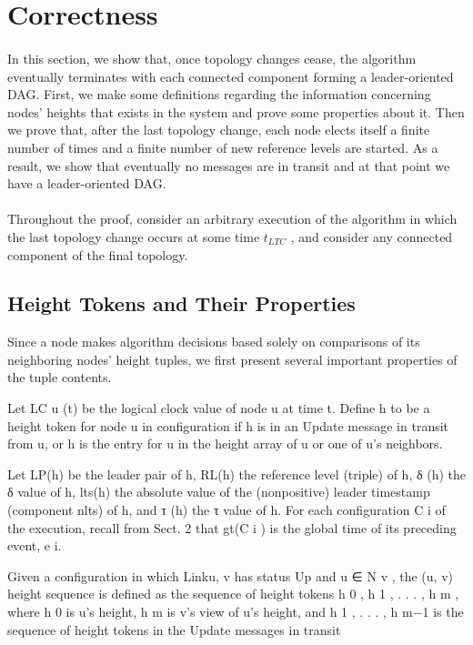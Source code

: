 \documentclass{article}
\begin{document}
\clearpage


\section{Correctness}

\paragraph{}
 
In this section, we show that, once topology changes cease, the algorithm eventually terminates with each connected component forming a leader-oriented DAG. First, we make some definitions regarding the information concerning nodes’ heights that exists in the system and prove some properties about it. Then we prove that, after the last topology change, each node elects itself a finite number of times and a finite number of new reference levels are started. As a result, we show that eventually no messages are in transit and at that point we have a leader-oriented DAG.
\paragraph{}
Throughout the proof, consider an arbitrary execution of the algorithm in which the last topology change occurs at some time $t_{LTC}$ , and consider any connected component of the final topology.

\subsection{Height Tokens and Their Properties}
Since a node makes algorithm decisions based solely on comparisons of its neighboring nodes’ height tuples, we
first present several important properties of the tuple contents.

Let LC u (t) be the logical clock value of node u at time t. Define h to be a height token for node u in configuration if h is in an Update message in transit from u, or h is the entry for u in the height array of u or one of u’s neighbors.

Let LP(h) be the leader pair of h, RL(h) the reference level (triple) of h, δ (h) the δ value of h, lts(h) the absolute value of the (nonpositive) leader timestamp (component nlts) of h, and τ (h) the τ value of h. For each configuration C i of the execution, recall from Sect. 2 that gt(C i ) is the global time of its preceding event, e i.

Given a configuration in which Link{u, v} has status Up and u ∈ N v , the (u, v) height sequence is defined as the sequence of height tokens h 0 , h 1 , . . . , h m , where h 0 is u’s height, h m is v’s view of u’s height, and h 1 , . . . , h m−1 is the sequence of height tokens in the Update messages in transit
\end{document}
